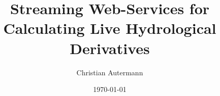 \documentclass[paper=a4,fontsize=11pt,
			   bibliography=totoc,
			   listof=nochaptergap,
			   listof=notoc]{scrreprt}
\begin{document}
	\title{Streaming Web-Services for Calculating Live Hydrological Derivatives}
	\author{Christian Autermann}
	\date{\today}
	\subject{Master Thesis}
	\begin{spacing}{1}
		\maketitle
	\end{spacing}


	\pagestyle{scrplain}
	{
		\tableofcontents
		\listoffigures
		\lstlistoflistings
		\listoftables
	}
	\clearpage

	\pagestyle{scrheadings}
	
	\clearpage

	
	\clearpage

	\appendix
	
	\clearpage

	
\end{document}
